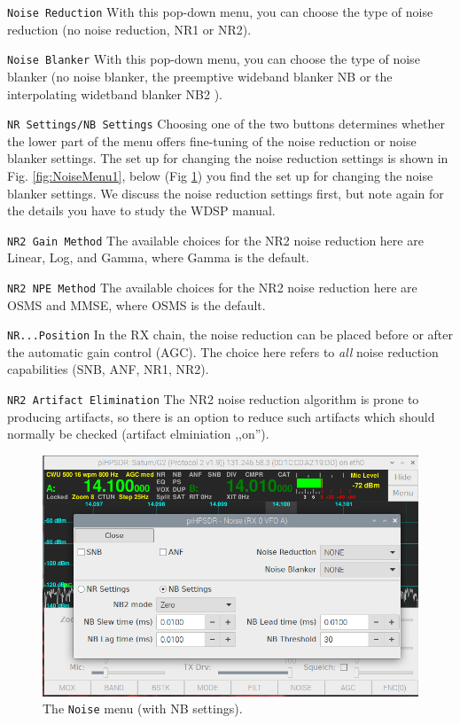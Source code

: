 \documentclass[12pt]{book}
\def\rett#1{\texttt{\color{red}#1}}
\def\bltt#1{\texttt{\color{blue}#1}}
\begin{document}
\rett{Noise Reduction} With this pop-down menu, you can choose the type of noise reduction
(no noise reduction, NR1 or NR2).

\rett{Noise Blanker} With this pop-down menu, you can choose the type of noise blanker
(no noise blanker, the preemptive wideband blanker NB or the interpolating widetband
blanker NB2 ).

\rett{NR Settings/NB Settings} Choosing one of the two buttons determines whether the
lower part of the menu offers fine-tuning of the noise reduction or noise blanker settings.
The set up for changing the noise reduction settings is shown in Fig. \ref{fig:NoiseMenu1},
below (Fig \ref{fig:NoiseMenu2}) you find the set up for changing the noise blanker settings.
We discuss the noise reduction settings first, but note again for the details you have
to study the WDSP manual.

\rett{NR2 Gain Method} The available choices for the NR2 noise reduction here are Linear, Log, and Gamma, where Gamma is the default.

\rett{NR2 NPE Method} The available choices for the NR2 noise reduction here are OSMS and MMSE,
where OSMS is the default.

\rett{NR...Position} In the RX chain, the noise reduction can be placed before or after
the automatic gain control (AGC). The choice here refers to \textit{all} noise reduction
capabilities (SNB, ANF, NR1, NR2).

\rett{NR2 Artifact Elimination} The NR2 noise reduction algorithm is prone to producing
artifacts, so there is an option to reduce such artifacts which should normally be checked
(artifact elminiation ,,on'').

\begin{figure}[ht]
\center
\includegraphics[width=12cm]{NoiseMenu2.png}
\caption{The \bltt{Noise} menu (with NB settings).}
\label{fig:NoiseMenu2}
\end{figure}
\end{document}
